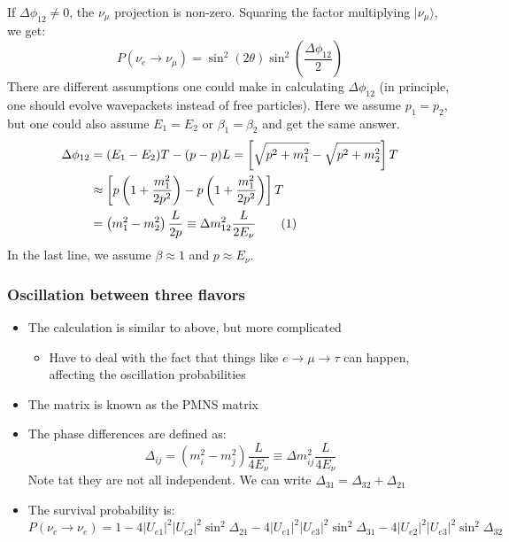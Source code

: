 \documentclass[11pt]{article}
\newcommand\numberthis{\addtocounter{equation}{1}\tag{\theequation}}
\newcommand{\ra}{\rangle}
\begin{document}
If $\Delta\phi_{12} \neq 0$, the $\nu_\mu$ projection is non-zero. Squaring the factor multiplying $|\nu_\mu\ra$, we get:
\begin{equation}
  P(\nu_e\rightarrow \nu_\mu) = \sin^2(2\theta) \sin^2 \left(\frac{\Delta\phi_{12}}{2}\right)
\end{equation}
There are different assumptions one could make in calculating $\Delta\phi_{12}$ (in principle, one should evolve wavepackets instead of free particles). Here we assume $p_1 = p_2$, but one could also assume $E_1 = E_2$ or $\beta_1 = \beta_2$ and get the same answer.
\begin{align*}
  \Delta\phi_{12} &= (E_1-E_2)T - (p-p)L = \left[\sqrt{p^2+m_1^2} - \sqrt{p^2+m_2^2}\right]T\\
    &\approx \left[p \left(1+ \frac{m_1^2}{2p^2}\right) - p \left(1+ \frac{m_1^2}{2p^2}\right)\right]T\\
    &= \left(m_1^2-m_2^2\right) \frac{L}{2p} \equiv \Delta m^2_{12} \frac{L}{2E_\nu} \numberthis
\end{align*}
In the last line, we assume $\beta \approx 1$ and $p\approx E_\nu$. 

\subsubsection{Oscillation between three flavors}
\begin{itemize}
  \item The calculation is similar to above, but more complicated
  \begin{itemize}
    \item Have to deal with the fact that things like $e\rightarrow\mu\rightarrow \tau$ can happen, affecting the oscillation probabilities
  \end{itemize}
  \item The matrix is known as the PMNS matrix
  \item The phase differences are defined as:
  \begin{equation}
    \Delta_{ij} = (m_i^2-m_j^2) \frac{L}{4E_\nu} \equiv \Delta m_{ij}^2 \frac{L}{4E_\nu}
  \end{equation}
  Note tat they are not all independent. We can write $\Delta_{31} = \Delta_{32} + \Delta_{21}$
  \item The survival probability is:
  \begin{equation}
    P(\nu_e\rightarrow\nu_e) = 1 - 4|U_{e1}|^2|U_{e2}|^2 \sin^2\Delta_{21} - 4|U_{e1}|^2|U_{e3}|^2 \sin^2\Delta_{31} - 4|U_{e2}|^2|U_{e3}|^2 \sin^2\Delta_{32}
  \end{equation}
\end{itemize}
\end{document}
